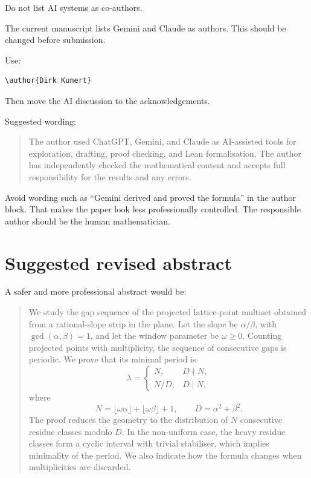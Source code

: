 \documentclass[11pt]{article}
\begin{document}
Do not list AI systems as co-authors.

The current manuscript lists Gemini and Claude as authors.  This should be
changed before submission.

Use:

\begin{verbatim}
\author{Dirk Kunert}
\end{verbatim}

Then move the AI discussion to the acknowledgements.

Suggested wording:

\begin{quote}
The author used ChatGPT, Gemini, and Claude as AI-assisted tools for
exploration, drafting, proof checking, and Lean formalisation.  The author
has independently checked the mathematical content and accepts full
responsibility for the results and any errors.
\end{quote}

Avoid wording such as ``Gemini derived and proved the formula'' in the author
block.  That makes the paper look less professionally controlled.  The
responsible author should be the human mathematician.

\section*{Suggested revised abstract}

A safer and more professional abstract would be:

\begin{quote}
We study the gap sequence of the projected lattice-point multiset obtained
from a rational-slope strip in the plane. Let the slope be
\(\alpha/\beta\), with \(\gcd(\alpha,\beta)=1\), and let the window parameter
be \(\omega \ge 0\). Counting projected points with multiplicity, the sequence
of consecutive gaps is periodic. We prove that its minimal period is
\[
\lambda =
\begin{cases}
N, & D\nmid N,\\
N/D, & D\mid N,
\end{cases}
\]
where
\[
N=\lfloor\omega\alpha\rfloor+\lfloor\omega\beta\rfloor+1,
\qquad
D=\alpha^2+\beta^2.
\]
The proof reduces the geometry to the distribution of \(N\) consecutive
residue classes modulo \(D\). In the non-uniform case, the heavy residue
classes form a cyclic interval with trivial stabiliser, which implies
minimality of the period. We also indicate how the formula changes when
multiplicities are discarded.
\end{quote}
\end{document}
